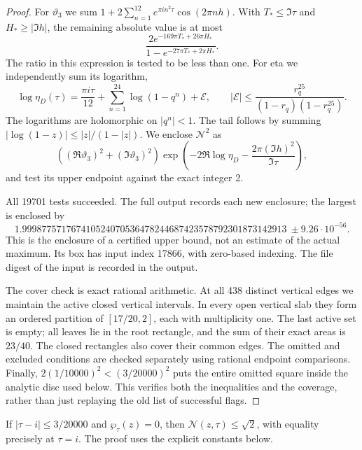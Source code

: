 \begin{proof}
For $\vartheta_3$ we sum
$1+2\sum_{n=1}^{12}e^{\pi i n^2\tau}\cos(2\pi nh)$.
With $T_*\leq\Im\tau$ and $H_*\geq|\Im h|$, the remaining
absolute value is at most
\[
 \frac{2e^{-169\pi T_*+26\pi H_*}}
 {1-e^{-27\pi T_*+2\pi H_*}}.
\]
The ratio in this expression is tested to be less than one. For eta
we independently sum its logarithm,
\[
 \log\eta_D(\tau)=\frac{\pi i\tau}{12}
          +\sum_{n=1}^{24}\log(1-q^n)+\mathcal E,
 \qquad
 |\mathcal E|\leq
 \frac{r_q^{25}}{(1-r_q)(1-r_q^{25})}.
\]
The logarithms are holomorphic on $|q^n|<1$. The tail follows by
summing $|\log(1-z)|\leq|z|/(1-|z|)$.
We enclose $\mathcal N^2$ as
\[
 ((\Re\vartheta_3)^2+(\Im\vartheta_3)^2)
 \exp\left(-2\Re\log\eta_D-
                   \frac{2\pi(\Im h)^2}{\Im\tau}\right),
\]
and test its upper endpoint against the exact integer 2.

All 19701 tests succeeded. The full output records each new enclosure;
the largest is enclosed by
\[
 1.999877571767410524070536478244687423578792301873142913
       \ \pm 9.26\cdot10^{-56}.
\]
This is the enclosure of a certified upper bound, not an estimate of
the actual maximum. Its box has input index 17866, with zero-based
indexing. The file digest of the input is recorded in the output.

The cover check is exact rational arithmetic. At all 438 distinct
vertical edges we maintain the active closed vertical intervals. In
every open vertical slab they form an ordered partition of
$[17/20,2]$, each with multiplicity one. The last active set is empty;
all leaves lie in the root rectangle, and the sum of their exact areas
is $23/40$. The closed rectangles also cover their common edges.
The omitted and excluded conditions are checked separately using
rational endpoint comparisons. Finally,
$2(1/10000)^2<(3/20000)^2$ puts the entire omitted square inside the
analytic disc used below. This verifies both the inequalities and
the coverage, rather than just replaying the old list of successful
flags.
\end{proof}

\begin{theorem}
If $|\tau-i|\leq3/20000$ and $\wp_\tau(z)=0$, then
$\mathcal N(z,\tau)\leq\sqrt2$, with equality precisely at
$\tau=i$. The proof uses the explicit constants below.
\end{theorem}

